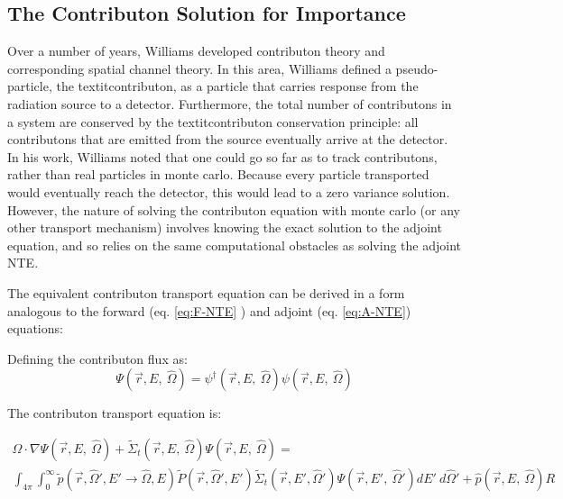 \subsection{The Contributon Solution for Importance}
\label{sec:ContributonImportance}

Over a number of years, Williams \cite{williams_generalized_1991,williams_contributorn_1992,williams_contributon_study} developed contributon theory and corresponding spatial channel theory. In this area, Williams defined a pseudo-particle, the textit{contributon}, as a particle that carries response from the radiation source to a detector. Furthermore, the total number of contributons in a system are conserved by the textit{contributon conservation principle}: all contributons that are emitted from the source eventually arrive at the detector.  In his work, Williams noted that one could go so far as to track contributons, rather than real particles in monte carlo. Because every particle transported would eventually reach the detector, this would lead to a zero variance solution. However, the nature of solving the contributon equation with monte carlo (or any other transport mechanism) involves knowing the exact solution to the adjoint equation, and so relies on the same computational obstacles as solving the adjoint NTE. 

The equivalent contributon transport equation can be derived in a form analogous to the forward (eq. \ref{eq:F-NTE} ) and adjoint (eq. \ref{eq:A-NTE}) equations:

Defining the contributon flux as:
\begin{equation}
\Psi (\vec {r} ,E,\:\hat\Omega) = \psi^{\dagger} (\vec {r} ,E,\:\hat\Omega) \psi(\vec {r} ,E,\:\hat\Omega)
\label{eq.Cont-Flux}
\end{equation}


The contributon transport equation is:

\begin{multline}
\hat\Omega \cdot \nabla \Psi (\vec {r} ,E,\:\hat\Omega)
+\widetilde{\Sigma} _{ t }(\vec{r},E,\:\hat\Omega)\Psi (\vec { r } ,E,\:\hat\Omega) 
= \\ 
\int _{ 4\pi  } \int _{ 0 }^{ \infty  } 
\widetilde{p}(\vec{r}, \hat\Omega', E'\rightarrow\hat\Omega, E)
\widetilde{P}(\vec{r}, \hat\Omega',E')
\widetilde{\Sigma} _{ t }(\vec{r}, E', \hat\Omega')
\Psi (\vec { r } ,E',\: \hat\Omega')dE' \:d\hat\Omega' 
+ \hat p(\vec { r } ,E, \:\hat\Omega) R
\end{multline}
\label{eq:Cont-NTE}

